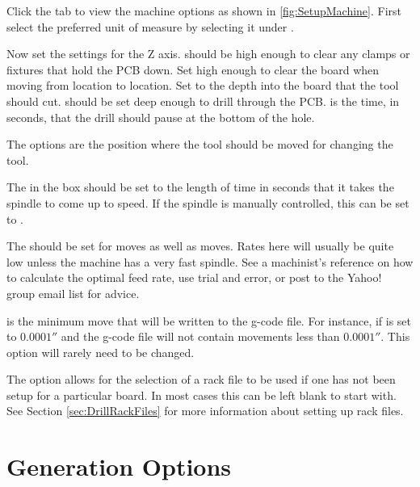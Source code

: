 \documentclass[11pt]{book}
\begin{document}
Click the  tab to view the machine options as shown in \figurename \vref{fig:SetupMachine}. First select the preferred unit of measure by selecting it under . 

Now set the settings for the Z axis.  should be high enough to clear any clamps or fixtures that hold the PCB down. Set  high enough to clear the board when moving from location to location. Set  to the depth into the board that the tool should cut.  should be set deep enough to drill through the PCB.  is the time, in seconds, that the drill should pause at the bottom of the hole.

The  options are the position where the tool should be moved for changing the tool.

The  in the  box should be set to the length of time in seconds that it takes the spindle to come up to speed. If the spindle is manually controlled, this can be set to .

The  should be set for  moves as well as  moves. Rates here will usually be quite low unless the machine has a very fast spindle. See a machinist's reference on how to calculate the optimal feed rate, use trial and error, or post to the Yahoo! group email list for advice.

 is the minimum move that will be written to the g-code file. For instance, if  is set to $0.0001''$ and the g-code file will not contain movements less than $0.0001''$. This option will rarely need to be changed.

The  option allows for the selection of a rack file to be used if one has not been setup for a particular board. In most cases this can be left blank to start with. See Section \vref{sec:DrillRackFiles} for more information about setting up rack files. 

%
%
\section{Generation Options}\label{sec:GenerationOptions}
\end{document}

